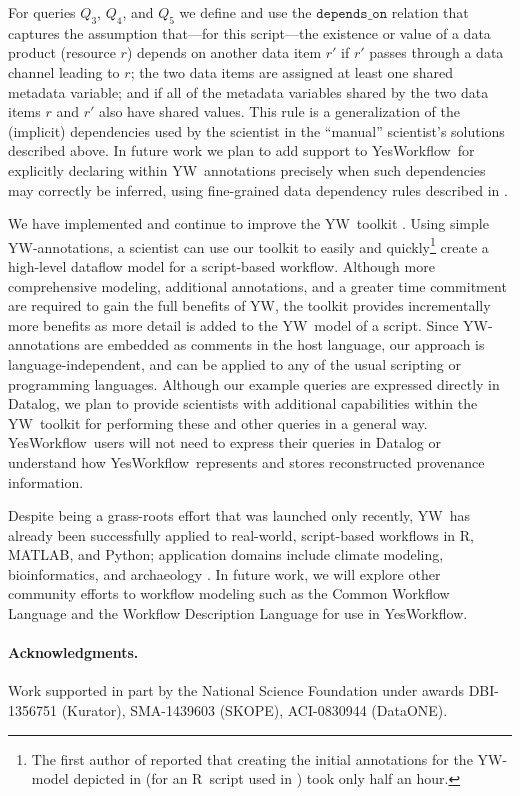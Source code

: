 \documentclass[nocopyrightspace]{sigplanconf}
\newcommand{\code}[1]{\ensuremath{\mathtt{#1}}}
\newcommand{\YW}{\textsf{YesWorkflow}}
\newcommand{\yw}{\textsf{YW}}
\newcommand{\R}{\textsf{R}}
\newcommand{\MATLAB}{\textsf{MATLAB}}
\begin{document}
For queries $Q_3$, $Q_4$, and $Q_5$ we define and use the
\code{depends\_on} relation that captures the assumption that---for
this script---the existence or value of a data product (resource $r$)
depends on another data item $r'$ if $r'$ passes through a data
channel leading to $r$; the two data items are assigned at least
one shared metadata variable; and if all of the metadata variables
shared by the two data items $r$ and $r'$ also have shared values.
This rule is a generalization of the (implicit) dependencies used by the
scientist in the ``manual'' scientist's solutions described above.  In
future work we plan to add support to \YW\ for explicitly declaring
within \yw\ annotations precisely when such dependencies may correctly
be inferred, using fine-grained data dependency rules described in
\cite{bowers2012rules}.

We have implemented and continue to improve the
\yw\ toolkit \cite{mcphillips2015ywIJDC,yw-website}. Using simple
\yw-annotations, a scientist can use our toolkit to easily and
quickly\footnote{The first author of \cite{bocinsky2014} reported that
  creating the initial annotations for the \yw-model depicted in
  \cite{mcphillips2015ywIJDC} (for an \R\ script used in
  \cite{bocinsky2014}) took only half an hour.  }  create a high-level
dataflow model for a script-based workflow.  Although more comprehensive 
modeling, additional annotations, and a greater time commitment are required 
to gain the full benefits of \yw, the toolkit provides incrementally more benefits 
as more detail is added to the \yw\ model of a script.  Since \yw-annotations are
embedded as comments in the host language, our approach is
language-independent, and can be applied to any of the usual scripting
or programming languages.  Although our example queries are expressed
directly in Datalog, we plan to provide scientists with additional capabilities
within the \yw\ toolkit for performing these and other queries in a general
way.  \YW\ users will not need to express their queries in Datalog
or understand how \YW\ represents and stores reconstructed provenance
information.

Despite being a grass-roots effort that was launched only recently,
\yw\ has already been successfully applied to real-world, script-based
workflows in \R, \MATLAB, and Python; application domains include
climate modeling, bioinformatics, and archaeology
\cite{mcphillips2015ywIJDC}.
In future work, we will explore other community efforts to workflow
modeling such as the Common Workflow Language \cite{amstutz15CDL} and
the Workflow Description Language \cite{frazer15WDL} for use in \YW.

\paragraph{Acknowledgments.}
Work supported in part by the National Science Foundation under awards
DBI-1356751 (Kurator), SMA-1439603 (SKOPE), ACI-0830944 (DataONE).




\end{document}
